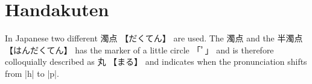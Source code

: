 \section{Handakuten} \label{sec:Handakuten}
 
 
 

In Japanese two different {濁点} {【だくてん】} are used. The {濁点}  and  the
{半濁点} {【はんだくてん】} has the marker of a little circle {「ﾟ」} and is
therefore colloquially described as {丸} {【まる】} and indicates when the
pronunciation shifts from |h| to |p|.

